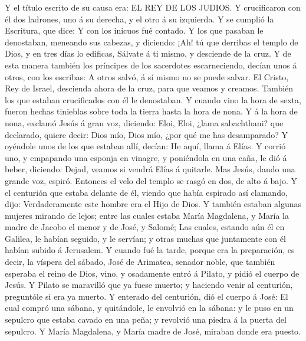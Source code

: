  Y el título escrito de su causa era: EL REY DE LOS JUDIOS.
 Y crucificaron con él dos ladrones, uno á su derecha, y el
otro á su izquierda.  Y se cumplió la Escritura, que dice:
Y con los inicuos fué contado.  Y los que pasaban le
denostaban, meneando sus cabezas, y diciendo: ¡Ah! tú que derribas el
templo de Dios, y en tres días lo edificas,  Sálvate á ti
mismo, y desciende de la cruz.  Y de esta manera también
los príncipes de los sacerdotes escarneciendo, decían unos á otros, con
los escribas: A otros salvó, á sí mismo no se puede salvar.
 El Cristo, Rey de Israel, descienda ahora de la cruz, para
que veamos y creamos. También los que estaban crucificados con él le
denostaban.  Y cuando vino la hora de sexta, fueron hechas
tinieblas sobre toda la tierra hasta la hora de nona.  Y á
la hora de nona, exclamó Jesús á gran voz, diciendo: Eloi, Eloi, ¿lama
sabachthani? que declarado, quiere decir: Dios mío, Dios mío, ¿por qué
me has desamparado?  Y oyéndole unos de los que estaban
allí, decían: He aquí, llama á Elías.  Y corrió uno, y
empapando una esponja en vinagre, y poniéndola en una caña, le dió á
beber, diciendo: Dejad, veamos si vendrá Elías á quitarle. 
Mas Jesús, dando una grande voz, espiró.  Entonces el velo
del templo se rasgó en dos, de alto á bajo.  Y el centurión
que estaba delante de él, viendo que había espirado así clamando, dijo:
Verdaderamente este hombre era el Hijo de Dios.  Y también
estaban algunas mujeres mirando de lejos; entre las cuales estaba María
Magdalena, y María la madre de Jacobo el menor y de José, y Salomé;
 Las cuales, estando aún él en Galilea, le habían seguido,
y le servían; y otras muchas que juntamente con él habían subido á
Jerusalem.  Y cuando fué la tarde, porque era la
preparación, es decir, la víspera del sábado,  José de
Arimatea, senador noble, que también esperaba el reino de Dios, vino, y
osadamente entró á Pilato, y pidió el cuerpo de Jesús.  Y
Pilato se maravilló que ya fuese muerto; y haciendo venir al centurión,
preguntóle si era ya muerto.  Y enterado del centurión, dió
el cuerpo á José:  El cual compró una sábana, y quitándole,
le envolvió en la sábana: y le puso en un sepulcro que estaba cavado en
una peña; y revolvió una piedra á la puerta del sepulcro. 
Y María Magdalena, y María madre de José, miraban donde era puesto.

